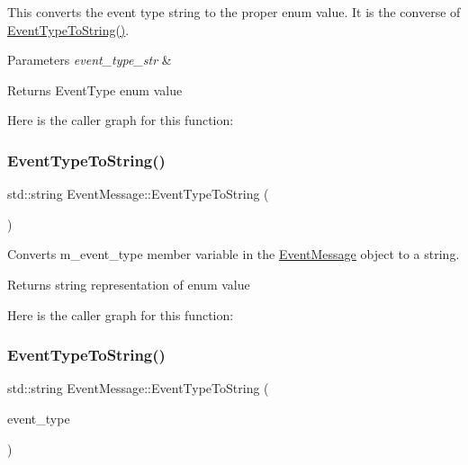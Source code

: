 This converts the event type string to the proper enum value. It is the converse of \mbox{\hyperlink{classEventMessage_a3dd4a7325fcc39e7cfdf2365422ae1c7}{Event\+Type\+To\+String()}}. 


\begin{DoxyParams}{Parameters}
{\em event\+\_\+type\+\_\+str} & \\
\hline
\end{DoxyParams}
\begin{DoxyReturn}{Returns}
Event\+Type enum value 
\end{DoxyReturn}
Here is the caller graph for this function\+:
\mbox{\label{classEventMessage_a3dd4a7325fcc39e7cfdf2365422ae1c7}} 
\subsubsection{\texorpdfstring{Event\+Type\+To\+String()}{EventTypeToString()}\hspace{0.1cm}{\footnotesize\ttfamily [1/2]}}
{\footnotesize\ttfamily std\+::string Event\+Message\+::\+Event\+Type\+To\+String (\begin{DoxyParamCaption}{ }\end{DoxyParamCaption})}



Converts m\+\_\+event\+\_\+type member variable in the \mbox{\hyperlink{classEventMessage}{Event\+Message}} object to a string. 

\begin{DoxyReturn}{Returns}
string representation of enum value 
\end{DoxyReturn}
Here is the caller graph for this function\+:
\mbox{\label{classEventMessage_ac6ffbdd947ed15375d4882003626b33e}} 
\subsubsection{\texorpdfstring{Event\+Type\+To\+String()}{EventTypeToString()}\hspace{0.1cm}{\footnotesize\ttfamily [2/2]}}
{\footnotesize\ttfamily std\+::string Event\+Message\+::\+Event\+Type\+To\+String (\begin{DoxyParamCaption}\item[{const \mbox{\hyperlink{classEventMessage_a262da559aa416f176fdda72e8b5113ab}{Event\+Type}} \&}]{event\+\_\+type }\end{DoxyParamCaption})\hspace{0.3cm}{\ttfamily [static]}}



